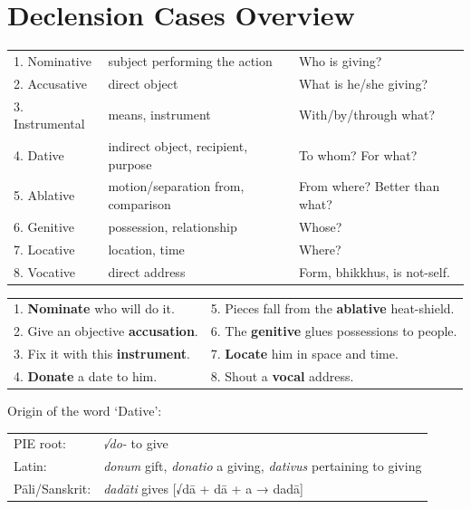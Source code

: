 \documentclass[11pt,oneside]{memoir}
\begin{document}
\normalArrayStrech

\clearpage

\section{Declension Cases Overview}
\label{sec:orgb91934f}

\begin{tabular}{lll}
1. Nominative & subject performing the action & Who is giving?\\[0pt]
2. Accusative & direct object & What is he/she giving?\\[0pt]
3. Instrumental & means, instrument & With/by/through what?\\[0pt]
4. Dative & indirect object, recipient, purpose & To whom? For what?\\[0pt]
5. Ablative & motion/separation from, comparison & From where? Better than what?\\[0pt]
6. Genitive & possession, relationship & Whose?\\[0pt]
7. Locative & location, time & Where?\\[0pt]
8. Vocative & direct address & Form, bhikkhus, is not-self.\\[0pt]
\end{tabular}


\begin{center}
\begin{tabular}{ll}
1. \textbf{Nominate} who will do it. & 5. Pieces fall from the \textbf{ablative} heat-shield.\\[0pt]
2. Give an objective \textbf{accusation}. & 6. The \textbf{genitive} glues possessions to people.\\[0pt]
3. Fix it with this \textbf{instrument}. & 7. \textbf{Locate} him in space and time.\\[0pt]
4. \textbf{Donate} a date to him. & 8. Shout a \textbf{vocal} address.\\[0pt]
\end{tabular}
\end{center}

Origin of the word `Dative':

\begin{center}
\begin{tabular}{ll}
PIE root: & \emph{√do-} to give\\[0pt]
Latin: & \emph{donum} gift, \emph{donatio} a giving, \emph{dativus} pertaining to giving\\[0pt]
Pāli/Sanskrit: & \emph{dadāti} gives [√dā + dā + a → dadā]\\[0pt]
\end{tabular}
\end{center}
\end{document}
